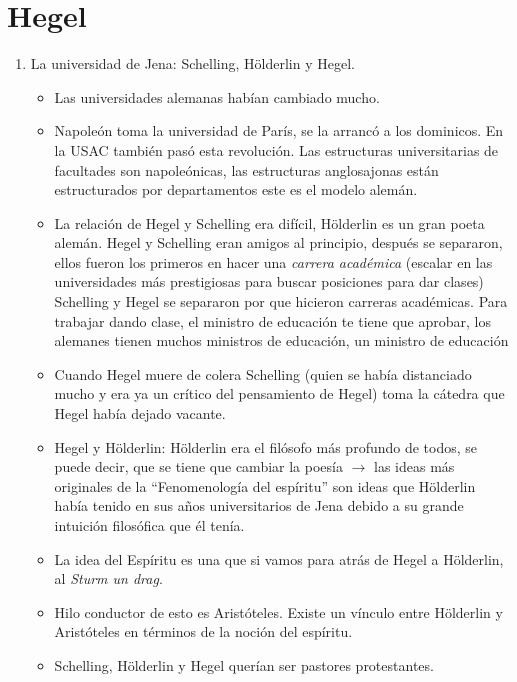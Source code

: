 \section{Hegel}
\begin{enumerate}
    \item La universidad de Jena: Schelling, Hölderlin y Hegel.
        \begin{itemize}
            \item Las universidades alemanas habían cambiado mucho. 
            \item Napoleón toma la universidad de París, se la arrancó a los dominicos. En la USAC también pasó esta revolución. Las estructuras universitarias de facultades son napoleónicas, las estructuras anglosajonas están estructurados por departamentos este es el modelo alemán.
            \item La relación de Hegel y Schelling era difícil, Hölderlin es un gran poeta alemán. Hegel y Schelling eran amigos al principio, después se separaron, ellos fueron los primeros en hacer una \emph{carrera académica} (escalar en las universidades más prestigiosas para buscar posiciones para dar clases) Schelling y Hegel se separaron por que hicieron carreras académicas. Para trabajar dando clase, el ministro de educación te tiene que aprobar, los alemanes tienen muchos ministros de educación, un ministro de educación 
            \item Cuando Hegel muere de colera Schelling (quien se había distanciado mucho y era ya un crítico del pensamiento de Hegel) toma la cátedra que Hegel había dejado vacante. 
            \item Hegel y Hölderlin: Hölderlin era el filósofo más profundo de todos, se puede decir, que se tiene que cambiar la poesía $\rightarrow$ las ideas más originales de la ``Fenomenología del espíritu''  son ideas que Hölderlin había tenido en sus años universitarios de Jena debido a su grande intuición filosófica que él tenía. 
            \item La idea del Espíritu es una que si vamos para atrás de Hegel a Hölderlin, al \emph{Sturm un drag}. 
            \item Hilo conductor de esto es Aristóteles. Existe un vínculo entre Hölderlin y Aristóteles en términos de la noción del espíritu.
            \item Schelling, Hölderlin y Hegel querían ser pastores protestantes. 
        \end{itemize}
    

\end{enumerate}
